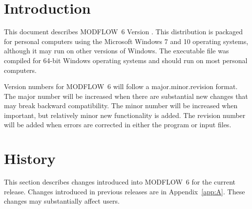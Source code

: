 \documentclass[11pt,twoside,twocolumn]{usgsreport}
\begin{document}
\ifdef{\makefrontcoveralt}{\makefrontcoveralt}{\makefrontcover}

\ifdef{\makefrontmatterabv}{\makefrontmatterabv}{\makefrontmatter}

\onecolumn
\pagestyle{body}
\RaggedRight
{}
\pagestyle{body}
\setlength{\parindent}{1.5pc}

\section{Introduction}
This document describes MODFLOW~6 Version \modflowversion.  This distribution is packaged for personal computers using the Microsoft Windows 7 and 10 operating systems, although it may run on other versions of Windows.  The executable file was compiled for 64-bit Windows operating systems and should run on most personal computers.

Version numbers for MODFLOW~6 will follow a major.minor.revision format.  The major number will be increased when there are substantial new changes that may break backward compatibility.  The minor number will be increased when important, but relatively minor new functionality is added.  The revision number will be added when errors are corrected in either the program or input files.

\section{History}
This section describes changes introduced into MODFLOW~6 for the current release.  Changes introduced in previous releases are in Appendix~\ref{app:A}. These changes may substantially affect users.
\end{document}
